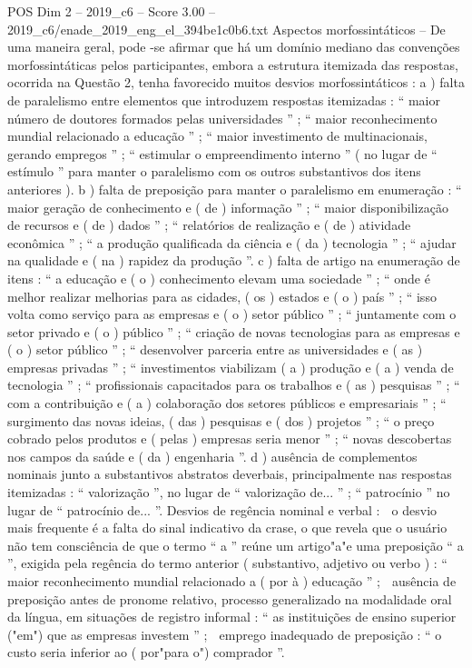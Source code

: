 \begin{textsample}{POS Dim 2 – 2019\_c6 – Score 3.00 – 2019\_c6/enade\_2019\_eng\_el\_394be1c0b6.txt}
Aspectos morfossintáticos – De uma maneira geral, pode -se afirmar que há um domínio mediano das convenções morfossintáticas pelos participantes, embora a estrutura itemizada das respostas, ocorrida na Questão 2, tenha favorecido muitos desvios morfossintáticos : a ) falta de paralelismo entre elementos que introduzem respostas itemizadas : “ maior número de doutores formados pelas universidades ” ; “ maior reconhecimento mundial relacionado a educação ” ; “ maior investimento de multinacionais, gerando empregos ” ; “ estimular o empreendimento interno ” ( no lugar de “ estímulo ” para manter o paralelismo com os outros substantivos dos itens anteriores ). b ) falta de preposição para manter o paralelismo em enumeração : “ maior geração de conhecimento e ( de ) informação ” ; “ maior disponibilização de recursos e ( de ) dados ” ; “ relatórios de realização e ( de ) atividade econômica ” ; “ a produção qualificada da ciência e ( da ) tecnologia ” ; “ ajudar na qualidade e ( na ) rapidez da produção ”. c ) falta de artigo na enumeração de itens : “ a educação e ( o ) conhecimento elevam uma sociedade ” ; “ onde é melhor realizar melhorias para as cidades, ( os ) estados e ( o ) país ” ; “ isso volta como serviço para as empresas e ( o ) setor público ” ; “ juntamente com o setor privado e ( o ) público ” ; “ criação de novas tecnologias para as empresas e ( o ) setor público ” ; “ desenvolver parceria entre as universidades e ( as ) empresas privadas ” ; “ investimentos viabilizam ( a ) produção e ( a ) venda de tecnologia ” ; “ profissionais capacitados para os trabalhos e ( as ) pesquisas ” ; “ com a contribuição e ( a ) colaboração dos setores públicos e empresariais ” ; “ surgimento das novas ideias, ( das ) pesquisas e ( dos ) projetos ” ; “ o preço cobrado pelos produtos e ( pelas ) empresas seria menor ” ; “ novas descobertas nos campos da saúde e ( da ) engenharia ”. d ) ausência de complementos nominais junto a substantivos abstratos deverbais, principalmente nas respostas itemizadas : “ valorização ”, no lugar de “ valorização de... ” ; “ patrocínio ” no lugar de “ patrocínio de... ”.
Desvios de regência nominal e verbal :  o desvio mais frequente é a falta do sinal indicativo da crase, o que revela que o usuário não tem consciência de que o termo “ a ” reúne um artigo"a"e uma preposição “ a ”, exigida pela regência do termo anterior ( substantivo, adjetivo ou verbo ) : “ maior reconhecimento mundial relacionado a ( por à ) educação ” ;  ausência de preposição antes de pronome relativo, processo generalizado na modalidade oral da língua, em situações de registro informal : “ as instituições de ensino superior ("em") que as empresas investem ” ;  emprego inadequado de preposição : “ o custo seria inferior ao ( por"para o") comprador ”.

\end{textsample}
